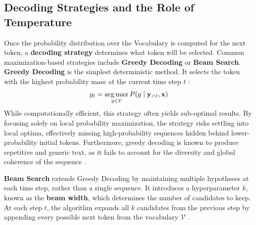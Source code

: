 \subsection{Decoding Strategies and the Role of Temperature}
\label{sec:background:llms:decoding}
Once the probability distribution over the Vocabulary is computed for 
the next token, a \textbf{decoding strategy} determines what token will
be selected. Common maximization-based strategies include 
\textbf{Greedy Decoding} or \textbf{Beam Search}.
\textbf{Greedy Decoding} is the simplest deterministic method. It 
selects the token with the highest probability mass at the current
time step $t$ \parencite{sutskever2014sequencesequencelearningneural}:
\begin{equation}
    y_t = \operatorname*{arg\,max}_{y \in \mathcal{V}} P(y \mid \mathbf{y}_{<t}, \mathbf{x})
    \label{eq:greedy_decoding}
\end{equation}
While computationally efficient, this strategy often yields 
sub-optimal results. By focusing solely on local probability 
maximization, the strategy risks settling into local optima, 
effectively missing high-probability sequences hidden behind 
lower-probability initial tokens.
Furthermore, greedy decoding is known to produce repetitive and 
generic text, as it fails to account for the diversity and 
global coherence of the sequence
\parencite{wiseman-rush-2016-sequence, holtzman2020curiouscaseneuraltext}.

\textbf{Beam Search} extends Greedy Decoding by maintaining multiple 
hypotheses at each time step, rather than a single sequence. It 
introduces a hyperparameter $k$, known as the \textbf{beam width}, 
which determines the number of candidates to keep.
At each step $t$, the algorithm expands all $k$ candidates from the 
previous step by appending every possible next token from the 
vocabulary $\mathcal{V}$
\parencite{freitag-al-onaizan-2017-beam}.

